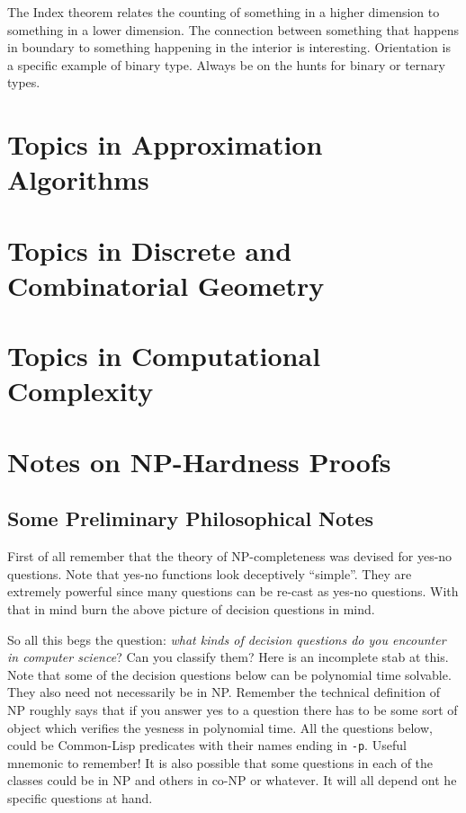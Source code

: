 \newchunk The Index theorem relates the counting of something in a higher dimension
to something in a lower dimension. The connection between something that happens in
boundary to something happening in the interior is interesting. Orientation is a specific
example of binary type. Always be on the hunts for binary or ternary types. 


\part{Topics in Approximation Algorithms}

\part{Topics in Discrete and Combinatorial
  Geometry}
\part{Topics in Computational Complexity}
\part{Notes on NP-Hardness Proofs}

\newpage
\chapter{Some Preliminary Philosophical Notes}

\newchunk 
First of all remember that the theory of NP-completeness was devised for yes-no questions. Note that 
yes-no functions look deceptively ``simple''. They are extremely powerful since many questions can be 
re-cast as yes-no questions. With that in mind burn the above picture of decision questions in mind. 

\newchunk  So all this begs the question: \emph{what kinds of decision questions do you encounter in computer science}?
Can you classify them? Here is an incomplete stab at this. Note that some of the decision questions
below can be polynomial time solvable. They also need not necessarily be in NP. Remember the technical 
definition of NP roughly says that if you answer yes to a question there has to be some sort of 
object which verifies the yesness in polynomial time. {\color{red} All the questions below, could be Common-Lisp 
predicates with their names ending in \texttt{-p}}. Useful mnemonic to remember! It is also possible that some questions
in each of the classes could be in NP and others in co-NP or whatever. It will all depend ont he specific 
questions at hand.


